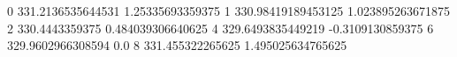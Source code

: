0 331.2136535644531 1.25335693359375
1 330.98419189453125 1.023895263671875
2 330.4443359375 0.484039306640625
4 329.6493835449219 -0.3109130859375
6 329.9602966308594 0.0
8 331.455322265625 1.495025634765625
